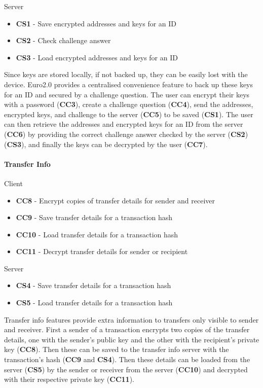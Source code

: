 \documentclass[a4paper,12pt]{article} %
\begin{document}
{{Server
\begin{itemize}
	\item \textbf{CS1} - Save encrypted addresses and keys for an ID
	\item \textbf{CS2} - Check challenge answer
	\item \textbf{CS3} - Load encrypted addresses and keys for an ID
\end{itemize}

Since keys are stored locally, if not backed up, they can be easily lost with the device. Euro2.0 provides a centralised convenience feature to back up these keys for an ID and secured by a challenge question. The user can encrypt their keys with a password (\textbf{CC3}), create a challenge question (\textbf{CC4}), send the addresses, encrypted keys, and challenge to the server (\textbf{CC5}) to be saved (\textbf{CS1}). The user can then retrieve the addresses and encrypted keys for an ID from the server (\textbf{CC6}) by providing the correct challenge answer checked by the server (\textbf{CS2}) (\textbf{CS3}), and finally the keys can be decrypted by the user (\textbf{CC7}).

\paragraph{Transfer Info}

Client
\begin{itemize}
	\item \textbf{CC8} - Encrypt copies of transfer details for sender and receiver
	\item \textbf{CC9} - Save transfer details for a transaction hash
	\item \textbf{CC10} - Load transfer details for a transaction hash
	\item \textbf{CC11} - Decrypt transfer details for sender or recipient
\end{itemize}

Server
\begin{itemize}
	\item \textbf{CS4} - Save transfer details for a transaction hash
	\item \textbf{CS5} - Load transfer details for a transaction hash
\end{itemize}

Transfer info features provide extra information to transfers only visible to sender and receiver. First a sender of a transaction encrypts two copies of the transfer details, one with the sender's public key and the other with the recipient's private key (\textbf{CC8}). Then these can be saved to the transfer info server with the transaction's hash (\textbf{CC9} and \textbf{CS4}). Then these details can be loaded from the server (\textbf{CS5}) by the sender or receiver from the server (\textbf{CC10}) and decrypted with their respective private key (\textbf{CC11}).

}}
\end{document}
